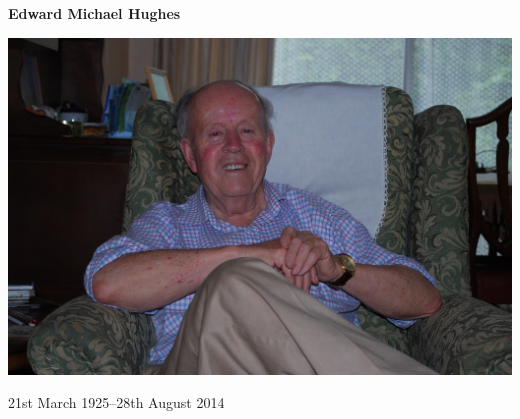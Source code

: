 \documentclass[10pt,twoside]{article}
\begin{document}
\thispagestyle{plain}

\begin{tcolorbox}
\centering  
{\huge\bfseries Edward Michael Hughes}

\includegraphics[width=\textwidth]{grandadSummer2008}

\centering
\large 21st March 1925--28th August 2014
\end{tcolorbox}



\end{document}
